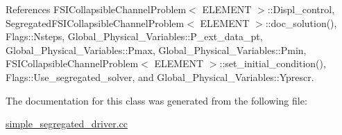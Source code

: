 References F\+S\+I\+Collapsible\+Channel\+Problem$<$ E\+L\+E\+M\+E\+N\+T $>$\+::\+Displ\+\_\+control, Segregated\+F\+S\+I\+Collapsible\+Channel\+Problem$<$ E\+L\+E\+M\+E\+N\+T $>$\+::doc\+\_\+solution(), Flags\+::\+Nsteps, Global\+\_\+\+Physical\+\_\+\+Variables\+::\+P\+\_\+ext\+\_\+data\+\_\+pt, Global\+\_\+\+Physical\+\_\+\+Variables\+::\+Pmax, Global\+\_\+\+Physical\+\_\+\+Variables\+::\+Pmin, F\+S\+I\+Collapsible\+Channel\+Problem$<$ E\+L\+E\+M\+E\+N\+T $>$\+::set\+\_\+initial\+\_\+condition(), Flags\+::\+Use\+\_\+segregated\+\_\+solver, and Global\+\_\+\+Physical\+\_\+\+Variables\+::\+Yprescr.



The documentation for this class was generated from the following file\+:\begin{DoxyCompactItemize}
\item 
\hyperlink{simple__segregated__driver_8cc}{simple\+\_\+segregated\+\_\+driver.\+cc}\end{DoxyCompactItemize}
